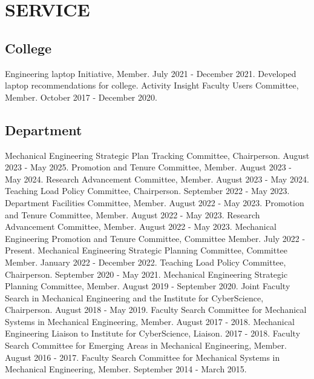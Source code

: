 \documentclass[a4paper,10pt]{article}
\begin{document}
\section*{SERVICE}
\subsection*{College}

\noindent Engineering laptop Initiative, Member. July 2021 - December 2021. Developed laptop recommendations for college.\newline
\noindent Activity Insight Faculty Users Committee, Member. October 2017 - December 2020.\newline

\subsection*{Department}

\noindent Mechanical Engineering Strategic Plan Tracking Committee, Chairperson. August 2023 - May 2025.\newline
\noindent Promotion and Tenure Committee, Member. August 2023 - May 2024.\newline
\noindent Research Advancement Committee, Member. August 2023 - May 2024.\newline
\noindent Teaching Load Policy Committee, Chairperson. September 2022 - May 2023.\newline
\noindent Department Facilities Committee, Member. August 2022 - May 2023.\newline
\noindent Promotion and Tenure Committee, Member. August 2022 - May 2023.\newline
\noindent Research Advancement Committee, Member. August 2022 - May 2023.\newline
\noindent Mechanical Engineering Promotion and Tenure Committee, Committee Member. July 2022 - Present.\newline
\noindent Mechanical Engineering Strategic Planning Committee, Committee Member. January 2022 - December 2022.\newline
\noindent Teaching Load Policy Committee, Chairperson. September 2020 - May 2021.\newline
\noindent Mechanical Engineering Strategic Planning Committee, Member. August 2019 - September 2020.\newline
\noindent Joint Faculty Search in Mechanical Engineering and the Institute for CyberScience, Chairperson. August 2018 - May 2019.\newline
\noindent Faculty Search Committee for Mechanical Systems in Mechanical Engineering, Member. August 2017 - 2018.\newline
\noindent Mechanical Engineering Liaison to Institute for CyberScience, Liaison. 2017 - 2018.\newline
\noindent Faculty Search Committee for Emerging Areas in Mechanical Engineering, Member. August 2016 - 2017.\newline
\noindent Faculty Search Committee for Mechanical Systems in Mechanical Engineering, Member. September 2014 - March 2015.\newline
\end{document}
